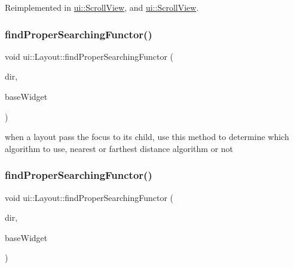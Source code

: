 Reimplemented in \hyperlink{classui_1_1ScrollView_adda46d15b5742af6e64a96b23c3ca10a}{ui\+::\+Scroll\+View}, and \hyperlink{classui_1_1ScrollView_adda46d15b5742af6e64a96b23c3ca10a}{ui\+::\+Scroll\+View}.

\mbox{\label{classui_1_1Layout_a9b6137410a64eff4c2a630aa7d2a703f}} 
\subsubsection{\texorpdfstring{find\+Proper\+Searching\+Functor()}{findProperSearchingFunctor()}\hspace{0.1cm}{\footnotesize\ttfamily [1/2]}}
{\footnotesize\ttfamily void ui\+::\+Layout\+::find\+Proper\+Searching\+Functor (\begin{DoxyParamCaption}\item[{\hyperlink{classui_1_1Widget_a8ae8e8fc793a04a87584205cd1e8a8a5}{Focus\+Direction}}]{dir,  }\item[{\hyperlink{classui_1_1Widget}{Widget} $\ast$}]{base\+Widget }\end{DoxyParamCaption})\hspace{0.3cm}{\ttfamily [protected]}}

when a layout pass the focus to it\textquotesingle{}s child, use this method to determine which algorithm to use, nearest or farthest distance algorithm or not \mbox{\label{classui_1_1Layout_a9b6137410a64eff4c2a630aa7d2a703f}} 
\subsubsection{\texorpdfstring{find\+Proper\+Searching\+Functor()}{findProperSearchingFunctor()}\hspace{0.1cm}{\footnotesize\ttfamily [2/2]}}
{\footnotesize\ttfamily void ui\+::\+Layout\+::find\+Proper\+Searching\+Functor (\begin{DoxyParamCaption}\item[{\hyperlink{classui_1_1Widget_a8ae8e8fc793a04a87584205cd1e8a8a5}{Focus\+Direction}}]{dir,  }\item[{\hyperlink{classui_1_1Widget}{Widget} $\ast$}]{base\+Widget }\end{DoxyParamCaption})\hspace{0.3cm}{\ttfamily [protected]}}

